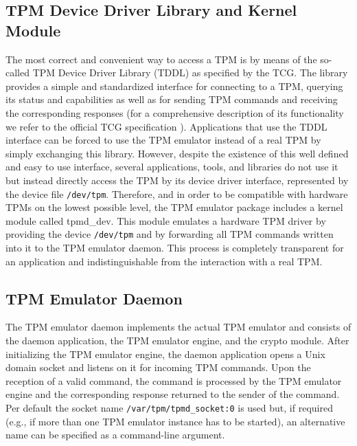 \documentclass[runningheads]{llncs}
\newcommand{\file}[1]{\small\texttt{#1}\normalsize}
\begin{document}

\subsection{TPM Device Driver Library and Kernel Module}
The most correct and convenient way to access a TPM is by means of the so-called TPM Device Driver
Library (TDDL) as specified by the TCG. The library provides a simple and standardized interface for
connecting to a TPM, querying its status and capabilities as well as for sending TPM commands and
receiving the corresponding responses (for a comprehensive description of its functionality we
refer to the official TCG specification \cite{TSS}). Applications that use the TDDL interface can
be forced to use the TPM emulator instead of a real TPM by simply exchanging this library. However,
despite the existence of this well defined and easy to use interface, several applications, tools,
and libraries do not use it but instead directly access the TPM by its device driver interface,
represented by the device file \file{/dev/tpm}. Therefore, and in order to be compatible with
hardware TPMs on the lowest possible level, the TPM emulator package includes a kernel module called
tpmd\_dev. This module emulates a hardware TPM driver by providing the device \file{/dev/tpm} and
by forwarding all TPM commands written into it to the TPM emulator daemon. This process is
completely transparent for an application and indistinguishable from the interaction with a real TPM.

\subsection{TPM Emulator Daemon}
The TPM emulator daemon implements the actual TPM emulator and consists of the daemon application,
the TPM emulator engine, and the crypto module. After initializing the TPM emulator engine, the
daemon application opens a Unix domain socket and listens on it for incoming TPM commands. Upon
the reception of a valid command, the command is processed by the TPM emulator engine and the
corresponding response returned to the sender of the  command. Per default the socket name
\file{/var/tpm/tpmd\_socket:0} is used but, if required (e.g., if more than one TPM emulator
instance has to be started), an alternative name can be specified as a command-line argument.
\end{document}

